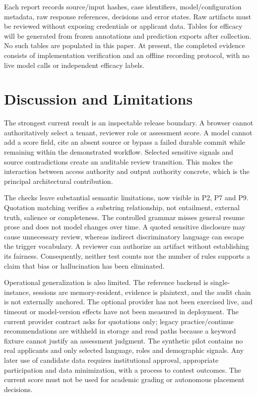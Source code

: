 \documentclass[conference]{IEEEtran}
\begin{document}
Each report records source/input hashes, case identifiers, model/configuration metadata, raw response references, decisions and error states. Raw artifacts must be reviewed without exposing credentials or applicant data. Tables for efficacy will be generated from frozen annotations and prediction exports after collection. No such tables are populated in this paper. At present, the completed evidence consists of implementation verification and an offline recording protocol, with no live model calls or independent efficacy labels.

\section{Discussion and Limitations}
The strongest current result is an inspectable release boundary. A browser cannot authoritatively select a tenant, reviewer role or assessment score. A model cannot add a score field, cite an absent source or bypass a failed durable commit while remaining within the demonstrated workflow. Selected sensitive signals and source contradictions create an auditable review transition. This makes the interaction between access authority and output authority concrete, which is the principal architectural contribution.

The checks leave substantial semantic limitations, now visible in P2, P7 and P9. Quotation matching verifies a substring relationship, not entailment, external truth, salience or completeness. The controlled grammar misses general resume prose and does not model changes over time. A quoted sensitive disclosure may cause unnecessary review, whereas indirect discriminatory language can escape the trigger vocabulary. A reviewer can authorize an artifact without establishing its fairness. Consequently, neither test counts nor the number of rules supports a claim that bias or hallucination has been eliminated.

Operational generalization is also limited. The reference backend is single-instance, sessions are memory-resident, evidence is plaintext, and the audit chain is not externally anchored. The optional provider has not been exercised live, and timeout or model-version effects have not been measured in deployment. The current provider contract asks for quotations only; legacy practice/continue recommendations are withheld in storage and read paths because a keyword fixture cannot justify an assessment judgment. The synthetic pilot contains no real applicants and only selected language, roles and demographic signals. Any later use of candidate data requires institutional approval, appropriate participation and data minimization, with a process to contest outcomes. The current score must not be used for academic grading or autonomous placement decisions.
\end{document}
